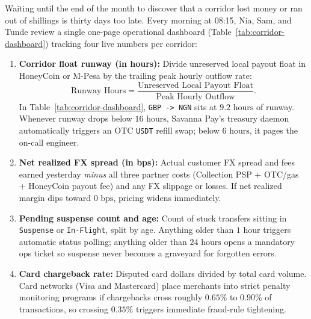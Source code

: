Waiting until the end of the month to discover that a corridor lost money or ran out of shillings is thirty days too late. Every morning at 08:15, Nia, Sam, and Tunde review a single one-page operational dashboard (Table~\ref{tab:corridor-dashboard}) tracking four live numbers per corridor:
\begin{enumerate}
  \item \textbf{Corridor float runway (in hours):} Divide unreserved local payout float in HoneyCoin or M-Pesa by the trailing peak hourly outflow rate:
  \[
    \text{Runway Hours} = \frac{\text{Unreserved Local Payout Float}}{\text{Peak Hourly Outflow}}.
  \]
  In Table~\ref{tab:corridor-dashboard}, \texttt{GBP -> NGN} sits at $9.2\text{ hours}$ of runway. Whenever runway drops below $16\text{ hours}$, Savanna Pay's treasury daemon automatically triggers an OTC \texttt{USDT} refill swap; below $6\text{ hours}$, it pages the on-call engineer.
  \item \textbf{Net realized FX spread (in bps):} Actual customer FX spread and fees earned yesterday \emph{minus} all three partner costs (Collection PSP + OTC/gas + HoneyCoin payout fee) and any FX slippage or losses. If net realized margin dips toward $0\text{ bps}$, pricing widens immediately.
  \item \textbf{Pending suspense count and age:} Count of stuck transfers sitting in \texttt{Suspense} or \texttt{In-Flight}, split by age. Anything older than $1\text{ hour}$ triggers automatic status polling; anything older than $24\text{ hours}$ opens a mandatory ops ticket so suspense never becomes a graveyard for forgotten errors.
  \item \textbf{Card chargeback rate:} Disputed card dollars divided by total card volume. Card networks (Visa and Mastercard) place merchants into strict penalty monitoring programs if chargebacks cross roughly $0.65\%$ to $0.90\%$ of transactions, so crossing $0.35\%$ triggers immediate fraud-rule tightening.
\end{enumerate}

